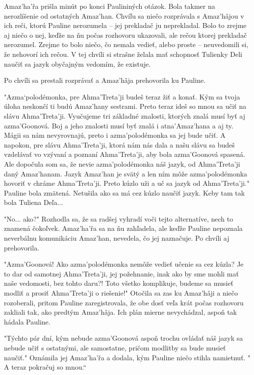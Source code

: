 \documentclass{book}
\begin{document}
Amaz'ha'r\v{}a prišla minút po konci Paulininých otázok. Bola takmer na nerozlíšenie od ostatných Amaz'han. Chvíľu sa niečo rozprávala s Amaz'ha\v{}jou v ich reči, ktorú Pauline nerozumela – jej prekladač ju neprekladal. Bolo to zrejme aj niečo o nej, keďže na ňu počas rozhovoru ukazovali, ale rečou ktorej prekladač nerozumel. Zrejme to bolo niečo, čo nemala vedieť, alebo proste – neuvedomili si, že nehovorí ich rečou. V tej chvíli si strašne želala mať schopnosť Tulienky Deli naučiť sa jazyk obyčajným vedomím, že existuje.

Po chvíli sa prestali rozprávať a Amaz'ha\v{}ja prehovorila ku Pauline.

"$ $Azma‘polodémonka, pre Ahma'Treta'ji budeš teraz žiť a konať. Kým sa tvoja úloha neskončí ti budú Amaz'hany sestrami. Preto teraz ideš so mnou sa učiť na slávu Ahma'Treta'ji. Vyučujeme tri základné znalosti, ktorých znalá musí byť aj azma'Goonová. Boj a jeho znalosti musí byť znalá i atna'Amaz'hana a aj ty. Mágii sa nám nevyrovnajú, preto i azma'polodémonka sa jej bude učiť. A napokon, pre slávu Ahma'Treta'ji, ktorá nám nás dala a našu slávu sa budeš vzdelávať vo vzývaní a poznaní Ahma'Treta'ji, aby bola azma'Goonová spasená. Ale dopočula som sa, že nevie azma'polodémonka náš jazyk, od Ahma'Treta'ji daný Amaz'hanam. Jazyk Amaz'han je svätý a len ním môže azma'polodémonka hovoriť v chráme Ahma'Treta'ji. Preto kúzlo uži a uč sa jazyk od Ahma'Treta'ji."$ $ Pauline bola zmätená. Netušila ako sa má cez kúzlo naučiť jazyk. Keby tam tak bola Tuliena Deľa...

"$ $No... ako?"$ $ Rozhodla sa, že sa radšej vyhradí voči tejto alternatíve, nech to znamená čokoľvek. Amaz'ha'r\v{}a sa na ňu zahľadela, ale keďže Pauline nepoznala neverbálnu komunikáciu Amaz'han, nevedela, čo jej naznačuje. Po chvíli aj prehovorila.

"$ $Azma'Goonová! Ako azma'polodémonka nemôže vedieť učenie sa cez kúzla? Je to dar od samotnej Ahma'Treta'ji, jej požehnanie, inak ako by sme mohli mať naše vedomosti, bez tohto daru?! Toto všetko komplikuje, budeme sa musieť modliť a prosiť Ahma'Treta'ji o riešenie!"$ $ Otočila sa zas ku Amaz'ha\v{}ji a niečo rozoberali, pritom Pauline zaregistrovala, že obe dosť veľa krát počas rozhovoru zakliali tak, ako predtým Amaz'ha\v{}ja. Ich plán mierne nevychádzal, aspoň tak hádala Pauline.

"$ $Týchto pár dní, kým nebude azma'Goonová aspoň trochu ovládať náš jazyk sa nebude učiť s ostatnými, ale samostatne, pričom modlitby sa bude musieť naučiť."$ $ Oznámila jej Amaz'ha'r\v{}a a dodala, kým Pauline niečo stihla namietnuť. "$ $A teraz pokračuj so mnou.“
\end{document}
